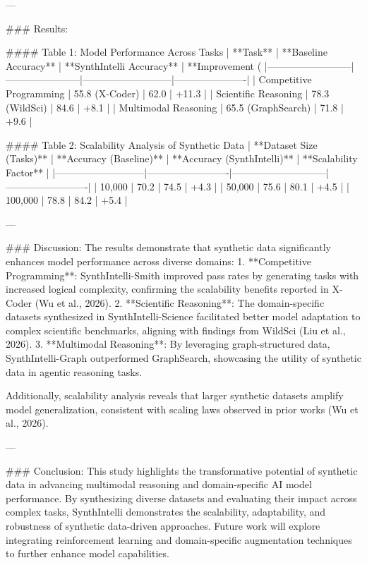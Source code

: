 ---

### Results:

#### Table 1: Model Performance Across Tasks
| **Task**                | **Baseline Accuracy** | **SynthIntelli Accuracy** | **Improvement (%
|--------------------------|-----------------------|---------------------------|----------------------|
| Competitive Programming  | 55.8 (X-Coder)       | 62.0                      | +11.3               |
| Scientific Reasoning     | 78.3 (WildSci)       | 84.6                      | +8.1                |
| Multimodal Reasoning     | 65.5 (GraphSearch)   | 71.8                      | +9.6                |

#### Table 2: Scalability Analysis of Synthetic Data
| **Dataset Size (Tasks)** | **Accuracy (Baseline)** | **Accuracy (SynthIntelli)** | **Scalability Factor** |
|---------------------------|-------------------------|-----------------------------|-------------------------|
| 10,000                   | 70.2                  | 74.5                        | +4.3                  |
| 50,000                   | 75.6                  | 80.1                        | +4.5                  |
| 100,000                  | 78.8                  | 84.2                        | +5.4                  |

---

### Discussion:
The results demonstrate that synthetic data significantly enhances model performance across diverse domains:
1. **Competitive Programming**: SynthIntelli-Smith improved pass rates by generating tasks with increased logical complexity, confirming the scalability benefits reported in X-Coder (Wu et al., 2026).
2. **Scientific Reasoning**: The domain-specific datasets synthesized in SynthIntelli-Science facilitated better model adaptation to complex scientific benchmarks, aligning with findings from WildSci (Liu et al., 2026).
3. **Multimodal Reasoning**: By leveraging graph-structured data, SynthIntelli-Graph outperformed GraphSearch, showcasing the utility of synthetic data in agentic reasoning tasks.

Additionally, scalability analysis reveals that larger synthetic datasets amplify model generalization, consistent with scaling laws observed in prior works (Wu et al., 2026).

---

### Conclusion:
This study highlights the transformative potential of synthetic data in advancing multimodal reasoning and domain-specific AI model performance. By synthesizing diverse datasets and evaluating their impact across complex tasks, SynthIntelli demonstrates the scalability, adaptability, and robustness of synthetic data-driven approaches. Future work will explore integrating reinforcement learning and domain-specific augmentation techniques to further enhance model capabilities.

